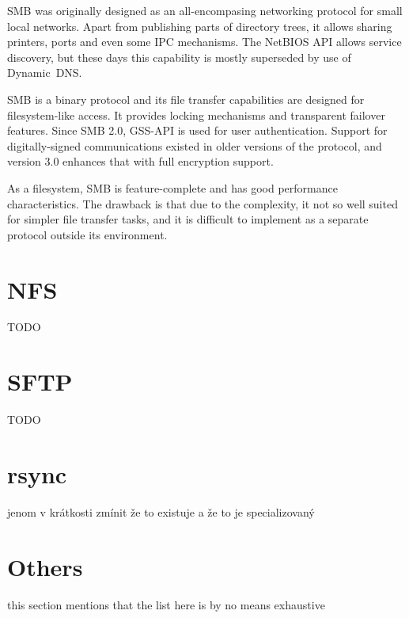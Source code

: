 SMB was originally designed as an all-encompasing networking protocol for small local networks. Apart from
publishing parts of directory trees, it allows sharing printers, ports and even some IPC mechanisms. The
NetBIOS API allows service discovery, but these days this capability is mostly superseded by use of
Dynamic~DNS.

SMB is a binary protocol and its file transfer capabilities are designed for filesystem-like access. It
provides locking mechanisms and transparent failover features. Since SMB 2.0, GSS-API is used for user
authentication.  Support for digitally-signed communications existed in older versions of the protocol, and
version 3.0 enhances that with full encryption support.

As a filesystem, SMB is feature-complete and has good performance characteristics. The drawback is that due to
the complexity, it not so well suited for simpler file transfer tasks, and it is difficult to implement as
a separate protocol outside its environment.

\section{NFS}

TODO

\section{SFTP}

TODO

\section{rsync}

jenom v krátkosti zmínit že to existuje a že to je specializovaný

\section{Others}

this section mentions that the list here is by no means exhaustive
